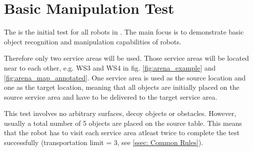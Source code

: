 
\newpage
\section{Basic Manipulation Test}
\label{sec:Basic Manipulation Test}

The  is the initial test for all robots in \RCAW .
The main focus is to demonstrate basic object recognition and manipulation capabilities of robots.

Therefore only two service areas will be used. Those service areas will be located near to each other, e.g. WS3 and WS4 in fig. \ref{fig:arena_example} and \ref{fig:arena_map_annotated}. One service area is used as the source location and one as the target location, meaning that all objects are initially placed on the source service area and have to be delivered to the target service area.

This test involves no arbitrary surfaces, decoy objects or obstacles.
However, usually a total number of 5 objects are placed on the source table.
This means that the robot has to visit each service area atleast twice to complete the test successfully (transportation limit = 3, see \ref{ssec: Common Rules}).


